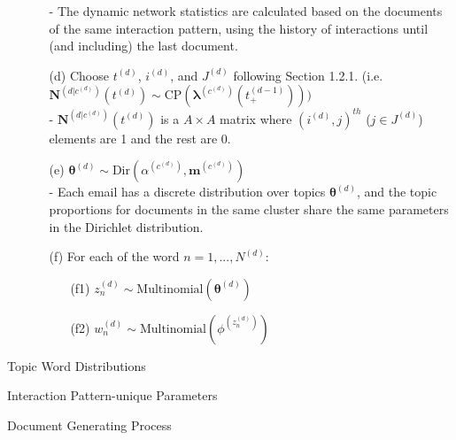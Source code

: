 \documentclass[a4paper]{article}
\begin{document}
\begin{itemize}
\begin{itemize}
			- The dynamic network statistics are calculated based on the documents of the same interaction pattern, using the history of interactions until (and including) the last document.
		\item[(d)] Choose $t^{(d)}$, $i^{(d)}$, and $J^{(d)}$ following Section 1.2.1. (i.e. $\mathbf{N}^{(d|c^{(d)})}(t^{(d)}) \sim \mbox{CP}(\boldsymbol{\lambda}^{(c^{(d)})}(t_+^{(d-1)})))$\\
		- $\mathbf{N}^{(d|c^{(d)})}(t^{(d)})$ is a $A\times A$ matrix where $(i^{(d)}, j)^{th}$ ($j \in J^{(d)}$) elements are 1 and the rest are 0.
		\item[(e)] $\boldsymbol{\theta}^{(d)}\sim \mbox{Dir}(\alpha^{(c^{(d)})}, \boldsymbol{m}^{(c^{(d)})})$\\
		- Each email has a discrete distribution over topics $\boldsymbol{\theta}^{(d)}$, and the topic proportions for documents in the same cluster share the same parameters in the Dirichlet distribution.
	\item[(f)] For each of the word $n = 1,...,N^{(d)}$:
\begin{itemize}
	\item [(f1)] $z_n^{(d)} \sim \mbox{Multinomial}(\boldsymbol{\theta}^{(d)})$
	\item [(f2)] $w_n^{(d)} \sim\mbox{Multinomial} (\phi^{(z_n^{(d)})})$
\end{itemize} 
	\end{itemize}
\end{itemize}
\begin{algorithm}[H]
	\SetAlgoLined
	\caption{Topic Word Distributions}
\end{algorithm}
\begin{algorithm}[H]
	\SetAlgoLined
	\caption{Interaction Pattern-unique Parameters}
\end{algorithm}
	\begin{algorithm}[H]
		\SetAlgoLined
		\caption{Document Generating Process}
	\end{algorithm}
\end{document}
